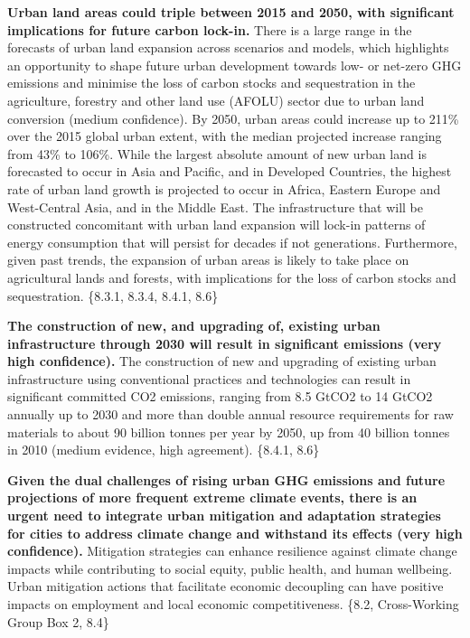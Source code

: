 \documentclass[
  letterpaper,
  DIV=11,
  numbers=noendperiod]{scrreprt}
\begin{document}
\textbf{Urban land areas could triple between 2015 and 2050, with
significant implications for future carbon lock-in.} There is a large
range in the forecasts of urban land expansion across scenarios and
models, which highlights an opportunity to shape future urban
development towards low- or net-zero GHG emissions and minimise the loss
of carbon stocks and sequestration in the agriculture, forestry and
other land use (AFOLU) sector due to urban land conversion (medium
confidence). By 2050, urban areas could increase up to 211\% over the
2015 global urban extent, with the median projected increase ranging
from 43\% to 106\%. While the largest absolute amount of new urban land
is forecasted to occur in Asia and Pacific, and in Developed Countries,
the highest rate of urban land growth is projected to occur in Africa,
Eastern Europe and West-Central Asia, and in the Middle East. The
infrastructure that will be constructed concomitant with urban land
expansion will lock-in patterns of energy consumption that will persist
for decades if not generations. Furthermore, given past trends, the
expansion of urban areas is likely to take place on agricultural lands
and forests, with implications for the loss of carbon stocks and
sequestration. \{8.3.1, 8.3.4, 8.4.1, 8.6\}

\textbf{The construction of new, and upgrading of, existing urban
infrastructure through 2030 will result in significant emissions (very
high confidence).} The construction of new and upgrading of existing
urban infrastructure using conventional practices and technologies can
result in significant committed CO2 emissions, ranging from 8.5 GtCO2 to
14 GtCO2 annually up to 2030 and more than double annual resource
requirements for raw materials to about 90 billion tonnes per year by
2050, up from 40 billion tonnes in 2010 (medium evidence, high
agreement). \{8.4.1, 8.6\}

\textbf{Given the dual challenges of rising urban GHG emissions and
future projections of more frequent extreme climate events, there is an
urgent need to integrate urban mitigation and adaptation strategies for
cities to address climate change and withstand its effects (very high
confidence).} Mitigation strategies can enhance resilience against
climate change impacts while contributing to social equity, public
health, and human wellbeing. Urban mitigation actions that facilitate
economic decoupling can have positive impacts on employment and local
economic competitiveness. \{8.2, Cross-Working Group Box 2, 8.4\}
\end{document}
